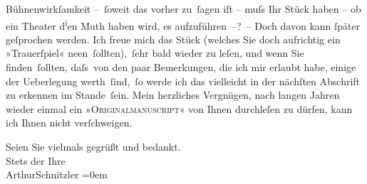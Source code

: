 \pstart
           {\pb}Bühnenwirkſamkeit – ſoweit das vorher zu ſagen iſt – muſs
               Ihr Stück haben – ob ein
               Theater d\substVorne{}\textsuperscript{i}\substDazwischen{}e\substHinten{}n Muth haben wird, es aufzuführen –? – Doch davon kann{ }ſpäter
               geſprochen werden. Ich freue mich das Stück (welches Sie doch aufrichtig ein »Trauerſpiel«
               ne{\geminationn}en ſollten), ſehr bald wieder zu leſen, und wenn Sie finden ſollten, daſs von den
               paar Bemerkungen, die ich mir erlaubt habe, einige der Ueberlegung werth ſind, ſo
               werde ich das viel{\pb}leicht in der nächſten Abschrift zu
               erkennen im Stande ſein. Mein herzliches Vergnügen, nach langen Jahren wieder einmal
               ein »\textsc{Originalmanuscript}« von Ihnen durchleſen zu dürfen,
               kann ich Ihnen nicht verſchweigen.\pend
           
\pstart
           Seien Sie vielmals gegrüßt und bedankt.{\\[\baselineskip]}Stets der Ihre{\\[\baselineskip]}\spacefill\mbox{ArthurSchnitzler}\pend
           \leftskip=0em{}\endnumbering{}
\begin{anhang}
\end{anhang}\newcommand{\dateiname}{L03910}\newcommand{\titel}{Arthur Schnitzler an Theodor Herzl, 17. 11. 1894}\newcommand{\editorInnen}{Herausgegeben von Jahnke, SelmaMüller, Martin Anton}
